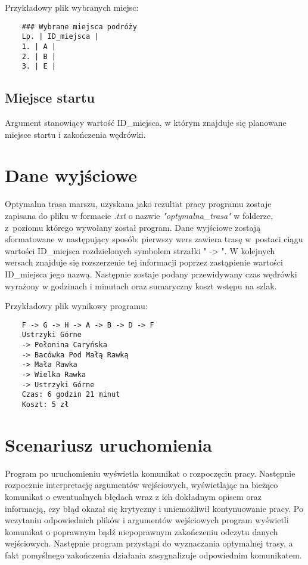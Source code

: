 \documentclass{article}
\begin{document}
\vspace{10pt}
Przykładowy plik wybranych miejsc:
\vspace{-8pt}
\begin{verbatim}
    ### Wybrane miejsca podróży
    Lp. | ID_miejsca |
    1. | A |
    2. | B |
    3. | E |
\end{verbatim}


\subsection{Miejsce startu}
Argument stanowiący wartość ID\_miejsca, w którym znajduje się planowane miejsce startu i zakończenia wędrówki.



\newpage
\section{Dane wyjściowe}
Optymalna trasa marszu, uzyskana jako rezultat pracy programu zostaje zapisana do pliku w formacie \textit{.txt} o nazwie \textit{"optymalna\_trasa"} w folderze, z~poziomu którego wywołany został program. Dane wyjściowe zostają sformatowane w następujący sposób: pierwszy wers zawiera trasę w~postaci ciągu wartości ID\_miejsca rozdzielonych symbolem strzałki " -> ". W kolejnych wersach znajduje się rozszerzenie tej informacji poprzez zastąpienie wartości ID\_miejsca jego nazwą. Następnie zostaje podany przewidywany czas wędrówki wyrażony w godzinach i minutach oraz sumaryczny koszt wstępu na szlak.

\vspace{10pt}
Przykładowy plik wynikowy programu:
\vspace{-8pt}
\begin{verbatim}
    F -> G -> H -> A -> B -> D -> F
    Ustrzyki Górne 
    -> Połonina Caryńska 
    -> Bacówka Pod Małą Rawką 
    -> Mała Rawka 
    -> Wielka Rawka 
    -> Ustrzyki Górne
    Czas: 6 godzin 21 minut
    Koszt: 5 zł
\end{verbatim}

\vspace{15pt}
\section{Scenariusz uruchomienia}
Program po uruchomieniu wyświetla komunikat o rozpoczęciu pracy. Następnie rozpocznie interpretację argumentów wejściowych, wyświetlając na bieżąco komunikat o ewentualnych błędach wraz z ich dokładnym opisem oraz informacją, czy błąd okazał się krytyczny i uniemożliwił kontynuowanie pracy. Po wczytaniu odpowiednich plików i argumentów wejściowych program wyświetli komunikat o poprawnym bądź niepoprawnym zakończeniu odczytu danych wejściowych. Następnie program przystąpi do wyznaczania optymalnej trasy, a fakt pomyślnego zakończenia działania zasygnalizuje odpowiednim komunikatem.
\end{document}
